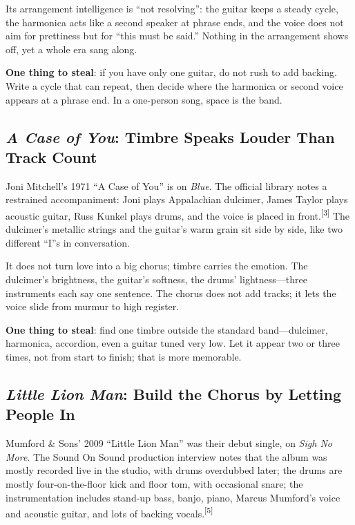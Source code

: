 Its arrangement intelligence is ``not resolving'': the guitar keeps a steady cycle, the harmonica acts like a second speaker at phrase ends, and the voice does not aim for prettiness but for ``this must be said.'' Nothing in the arrangement shows off, yet a whole era sang along.

\textbf{One thing to steal}: if you have only one guitar, do not rush to add backing. Write a cycle that can repeat, then decide where the harmonica or second voice appears at a phrase end. In a one-person song, space is the band.

\subsection{\emph{A Case of You}: Timbre Speaks Louder Than Track Count}
\label{sec:folk-case-joni}

Joni Mitchell's 1971 ``A Case of You'' is on \emph{Blue}. The official library notes a restrained accompaniment: Joni plays Appalachian dulcimer, James Taylor plays acoustic guitar, Russ Kunkel plays drums, and the voice is placed in front.{\textsuperscript{[3]}} The dulcimer's metallic strings and the guitar's warm grain sit side by side, like two different ``I''s in conversation.

It does not turn love into a big chorus; timbre carries the emotion. The dulcimer's brightness, the guitar's softness, the drums' lightness---three instruments each say one sentence. The chorus does not add tracks; it lets the voice slide from murmur to high register.

\textbf{One thing to steal}: find one timbre outside the standard band---dulcimer, harmonica, accordion, even a guitar tuned very low. Let it appear two or three times, not from start to finish; that is more memorable.

\subsection{\emph{Little Lion Man}: Build the Chorus by Letting People In}
\label{sec:folk-case-mumford}

Mumford \& Sons' 2009 ``Little Lion Man'' was their debut single, on \emph{Sigh No More}. The Sound On Sound production interview notes that the album was mostly recorded live in the studio, with drums overdubbed later; the drums are mostly four-on-the-floor kick and floor tom, with occasional snare; the instrumentation includes stand-up bass, banjo, piano, Marcus Mumford's voice and acoustic guitar, and lots of backing vocals.{\textsuperscript{[5]}}

